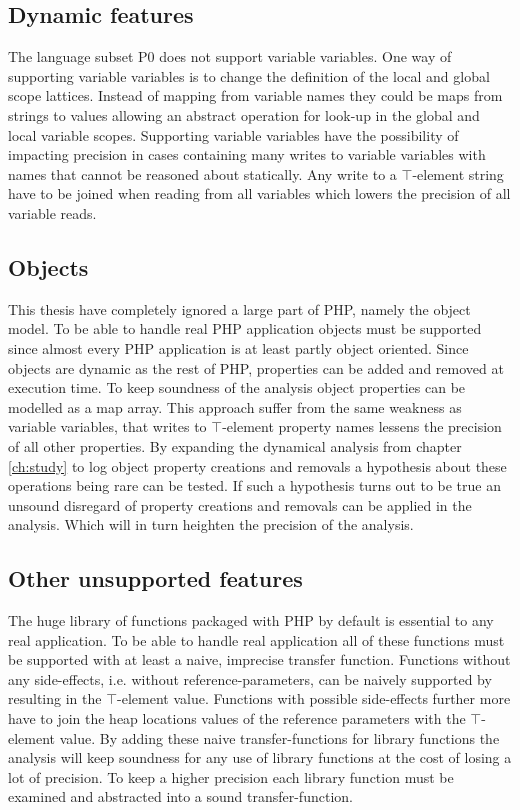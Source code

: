 \subsection{Dynamic features}
The language subset P0 does not support variable variables. One way of supporting variable variables is to change the definition of the local and global scope lattices. Instead of mapping from variable names they could be maps from strings to values allowing an abstract operation for look-up in the global and local variable scopes. Supporting variable variables have the possibility of impacting precision in cases containing many writes to variable variables with names that cannot be reasoned about statically. Any write to a $\top$-element string have to be joined when reading from all variables which lowers the precision of all variable reads.




\subsection{Objects}
This thesis have completely ignored a large part of PHP, namely the object model. To be able to handle real PHP application objects must be supported since almost every PHP application is at least partly object oriented. Since objects are dynamic as the rest of PHP, properties can be added and removed at execution time. To keep soundness of the analysis object properties can be modelled as a map array. This approach suffer from the same weakness as variable variables, that writes to $\top$-element property names lessens the precision of all other properties. By expanding the dynamical analysis from chapter \ref{ch:study} to log object property creations and removals a hypothesis about these operations being rare can be tested. If such a hypothesis turns out to be true an unsound disregard of property creations and removals can be applied in the analysis. Which will in turn heighten the precision of the analysis.

\subsection{Other unsupported features}
The huge library of functions packaged with PHP by default is essential to any real application. To be able to handle real application all of these functions must be supported with at least a naive, imprecise transfer function. Functions without any side-effects, i.e. without reference-parameters, can be naively supported by resulting in the $\top$-element value. Functions with possible side-effects further more have to join the heap locations values of the reference parameters with the $\top$-element value. By adding these naive transfer-functions for library functions the analysis will keep soundness for any use of library functions at the cost of losing a lot of precision. To keep a higher precision each library function must be examined and abstracted into a sound transfer-function.

